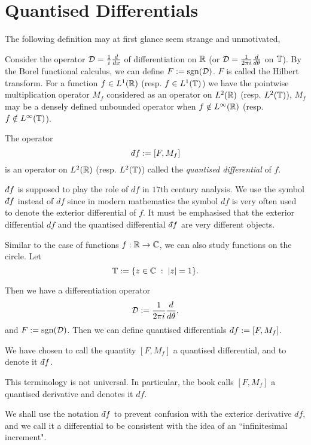\section{Quantised Differentials}
The following definition may at first glance seem strange and unmotivated,
\begin{definition}
    Consider the operator $\mathcal{D} = \frac{1}{i}\frac{d}{dx}$ of differentiation
    on $\mathbb{R}$ (or $\mathcal{D} = \frac{1}{2\pi i}\frac{d}{d\theta}$ on $\mathbb{T}$). By the Borel functional calculus, we can define $F := \operatorname{sgn}(\mathcal{D})$. 
    $F$ is called the Hilbert transform. For a function $f \in L^1(\mathbb{R})$ (resp. $f \in L^1(\mathbb{T})$)
    we have the pointwise multiplication
    operator $M_f$ considered as an operator on $L^2(\mathbb{R})$ (resp. $L^2(\mathbb{T})$), $M_f$
    may be a densely defined unbounded operator when $f \notin L^\infty(\mathbb{R})$ 
    (resp. $f \notin L^\infty(\mathbb{T})$).
    
    The operator
    \begin{equation}
        \qd f := [F,M_f]
    \end{equation}
    is an operator on $L^2(\mathbb{R})$ (resp. $L^2(\mathbb{T})$)
    called the \emph{quantised differential} of $f$.
\end{definition}

$\qd f$ is supposed to play the role of $df$ in $17$th century analysis. 
We use the symbol $\qd f$ instead of $df$ since in modern mathematics the symbol $df$
is very often used to denote the exterior differential of $f$. It must be emphasised
that the exterior differential $df$ and the quantised differential $\qd f$ are very different objects.

Similar to the case of functions $f:\mathbb{R}\rightarrow \mathbb{C}$, we can also
study functions on the circle. Let
\begin{equation}
    \mathbb{T} := \{z \in \mathbb{C}\;:\;|z| = 1\}.
\end{equation}

Then we have a differentiation operator 
\begin{equation}
    \mathcal{D} := \frac{1}{2\pi i} \frac{d}{d\theta},
\end{equation}
and $F := \operatorname{sgn}(\mathcal{D})$. Then we can define quantised
differentials $\qd f := [F,M_f]$. 

\begin{remark}
    We have chosen to call the quantity $[F,M_f]$
    a quantised differential, and to denote it $\qd f$. 
    
    This terminology is not universal. In particular, the book \cite{Connes94}
    calls $[F,M_f]$ a quantised derivative and denotes it $df$. 
    
    We shall use the notation $\qd f$ to prevent confusion with the exterior
    derivative $df$, and we call it a differential to be consistent
    with the idea of an ``infinitesimal increment".
\end{remark}    

